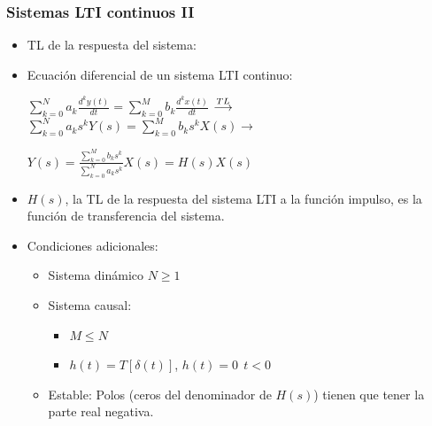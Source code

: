 \begin{frame}
\frametitle{Sistemas LTI continuos II}

\vspace{-0,3cm}


\begin{itemize}

\item <1-> \alert{TL de la respuesta del sistema}:

\vspace{0.2cm}


\vspace{0.2cm}

\item <2-> \alert{Ecuación diferencial de un sistema LTI continuo:}

\vspace{0.2cm}


\hspace{0.5cm} {\footnotesize $\sum_{k=0}^N {a_k \frac{d^k y(t)}{dt}}=\sum_{k=0}^M {b_k \frac{d^k x(t)}{dt}}$   $\buildrel TL \over  \longrightarrow$   $\sum_{k=0}^N a_k s^k Y(s)=\sum_{k=0}^M b_k s^k X(s)  \rightarrow $

\vspace{0.2cm}

\hspace{0.5cm} $Y(s)=\frac{\sum_{k=0}^M b_k s^k}{\sum_{k=0}^N a_k s^k}X(s)=H(s)X(s)$}

\vspace{0.2cm}

\item $H(s)$, la TL de la respuesta del sistema LTI a la función impulso, es la función de transferencia del sistema.

\vspace{0.2cm}

\item <3-> \alert{Condiciones adicionales:}

\begin{itemize}
\item Sistema dinámico $N \ge 1$
\item Sistema causal: 
\begin{itemize} 
\item $M \le N$
\item $h(t)=T[\delta(t)]$,  $h(t)=0 \: \: t<0$
\end{itemize}
\item Estable: Polos (ceros del denominador de $H(s)$) tienen que tener la parte real negativa.
\end{itemize}


\end{itemize}


\end{frame}




